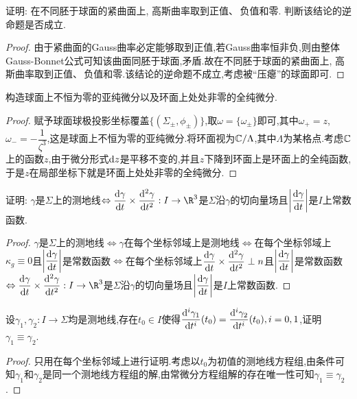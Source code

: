 	\begin{excise}
		证明: 在不同胚于球面的紧曲面上, 高斯曲率取到正值、\,负值和零. 判断该结论的逆命题是否成立.
	\end{excise}
	\begin{proof}
		由于紧曲面的Gauss曲率必定能够取到正值,若Gauss曲率恒非负,则由整体Gauss-Bonnet公式可知该曲面同胚于球面,矛盾.故在不同胚于球面的紧曲面上, 高斯曲率取到正值、\,负值和零.该结论的逆命题不成立,考虑被“压瘪”的球面即可.
	\end{proof}
	\begin{excise}
		构造球面上不恒为零的亚纯微分以及环面上处处非零的全纯微分.
	\end{excise}
	\begin{proof}
		赋予球面球极投影坐标覆盖$\{(\Sigma_{\pm},\phi_{\pm})\}$,取$\omega=\{\omega_{\pm}\}$即可,其中$\omega_{+}=z$, $\omega_{-}=-\dfrac{1}{\zeta^{3}}$,这是球面上不恒为零的亚纯微分.将环面视为$\mathbb{C}/\Lambda$,其中$\Lambda$为某格点.考虑$\mathbb{C}$上的函数$z$,由于微分形式$\mathrm{d} z$是平移不变的,并且$z$下降到环面上是环面上的全纯函数,于是$z$在局部坐标下就是环面上处处非零的全纯微分.
	\end{proof}
	\begin{excise}
		证明: $\gamma$是$\Sigma$上的测地线$\Leftrightarrow \dfrac{\d\gamma}{\d t}\times \dfrac{\d^{2}\gamma}{\d t^{2}}:I\to\R^{3}$是$\Sigma$沿$\gamma$的切向量场且$\left| \dfrac{\mathrm{d}\gamma}{\mathrm{d} t} \right|$是$I$上常数函数.
	\end{excise}
	\begin{proof}
		$\gamma$是$\Sigma$上的测地线$\Leftrightarrow \gamma$在每个坐标邻域上是测地线$\Leftrightarrow$在每个坐标邻域上$\kappa_{g}\equiv0$且$\left| \dfrac{\mathrm{d}\gamma}{\mathrm{d} t} \right|$是常数函数$\Leftrightarrow$在每个坐标邻域上$\dfrac{\mathrm{d}\gamma}{\mathrm{d} t}\times \dfrac{\mathrm{d}^{2}\gamma}{\mathrm{d} t^{2}}\perp n$且$\left| \dfrac{\mathrm{d}\gamma}{\mathrm{d} t} \right|$是常数函数$\Leftrightarrow \dfrac{\d\gamma}{\d t}\times \dfrac{\d^{2}\gamma}{\d t^{2}}:I\to\R^{3}$是$\Sigma$沿$\gamma$的切向量场且$\left| \dfrac{\mathrm{d}\gamma}{\mathrm{d} t} \right|$是$I$上常数函数.
	\end{proof}
	\begin{excise}
		设$\gamma_{1},\gamma_{2}:I\to\Sigma$均是测地线,存在$t_{0}\in I$使得$\dfrac{\mathrm{d}^{i}\gamma_{1}}{\mathrm{d}  t^{i}}(t_{0})=\dfrac{\mathrm{d}^{i}\gamma_{2}}{\mathrm{d} t^{i}}(t_{0}),i=0,1$,证明$\gamma_{1}\equiv\gamma_{2}$.
	\end{excise}
	\begin{proof}
		只用在每个坐标邻域上进行证明.考虑以$t_{0}$为初值的测地线方程组,由条件可知$\gamma_{1}$和$\gamma_{2}$是同一个测地线方程组的解,由常微分方程组解的存在唯一性可知$\gamma_{1}\equiv\gamma_{2}$.
	\end{proof}

